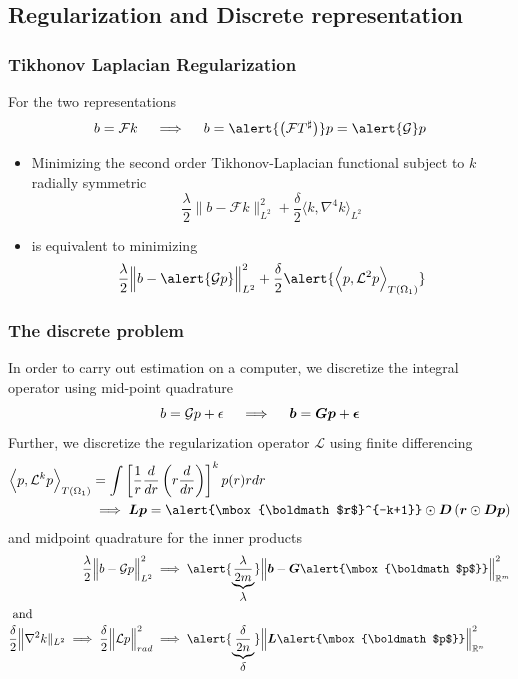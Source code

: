 \documentclass[]{beamer}
\newcommand{\R}{\ensuremath{\mathbb R}}  %
\newcommand{\ds}{\displaystyle}
\newcommand{\G}{\ensuremath{\mathcal G}}
\newcommand{\F}{\ensuremath{\mathcal F}}
\newcommand{\LL}{\ensuremath{\mathcal L}}
\newcommand{\bm}[1]{\mbox{\boldmath$#1$}}
\newcommand{\vect}[1]{\bm{#1}}
\begin{document}
\subsection{Regularization and Discrete representation}
\begin{frame}
  \frametitle{Tikhonov Laplacian Regularization}
  {\footnotesize For the two representations }
  \begin{equation*}
   b= \mathcal F k \quad \implies\quad  b =  \alert{\left(\mathcal F T^\sharp\right)} p = \alert{\mathcal G} p 
  \end{equation*}
  {\footnotesize
  \begin{itemize}
    \itemsep 1.2em
    \item Minimizing the second order Tikhonov-Laplacian functional subject to $k$ radially symmetric
    $$ \frac \lambda 2 \Big\|b - \F k\Big\|_{L^2}^2 + \frac \delta 2 \Big\langle k,\nabla^4 k\Big\rangle_{L^2}  $$
    \item is equivalent to minimizing 
    $$ \frac \lambda 2 \Big\|b - \alert{\G p}\Big\|_{L^2}^2 + \frac \delta 2 \alert{\Big\langle p,\LL^2 p\Big\rangle_{T(\Omega_1)}}  $$
  \end{itemize}
  }
\end{frame}
\begin{frame}
  \frametitle{The discrete problem}
  {\footnotesize 
  In order to carry out estimation on a computer, we discretize the integral operator using \alert{mid-point quadrature}}
  $$
    b = \mathcal G p + \epsilon\quad \implies \quad \vect b = \vect G \vect p + \vect\epsilon
  $$
  {\footnotesize  Further, we discretize the regularization operator $\LL$ using \alert{finite differencing} }
    \begin{align*}
      \Big\langle p, \LL^k p \Big\rangle_{T(\Omega_1)} 
      &= \int \left[\frac1r \frac{d}{dr} \left(r \frac d{dr} \right)\right]^kp(r)  rdr \\
      &\implies \vect L \vect p = \alert{\vect r^{-k+1}} \odot \vect D \left(\vect r \odot \vect D\vect p\right) 
    \end{align*}
    {\footnotesize and \alert{midpoint quadrature} for the inner products
    \begin{align*}
      \frac \lambda {2} \Big\|b - \G p\Big\|_{L^2}^2 &\implies \alert{\underbrace{\frac \lambda {2m}}_{\ds{\lambda}}} \Big\|\vect b - \vect G \alert{\vect p}\Big\|_{\R^m}^2 \\ 
      \intertext{ and }
      \frac\delta2 \Big\|\nabla^2 k\|_{L^2} \implies \frac \delta {2} \Big\|\LL p\Big\|_{rad}^2  &\implies \alert{\underbrace{\frac \delta {2n}}_{\ds{\delta}}} \Big\|\vect L  \alert{\vect p}\Big\|_{\R^n}^2  
    \end{align*}
    }
\end{frame}
\end{document}
